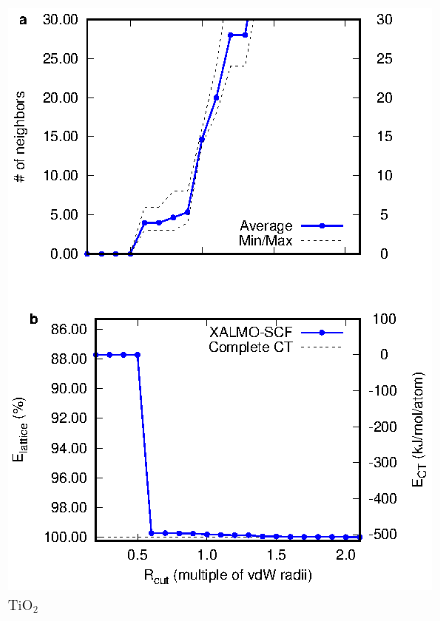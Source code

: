 \documentclass[aps,prb,twocolumn,amsmath,amssymb,superscriptaddress,longbibliography]{revtex4-1}
\begin{document}
\begin{figure}
\includegraphics[scale=1]{plots/TiO2_EvR}
\caption{$\text{TiO}_{2}$}
\label{tio2graph}
\end{figure}
\end{document}

